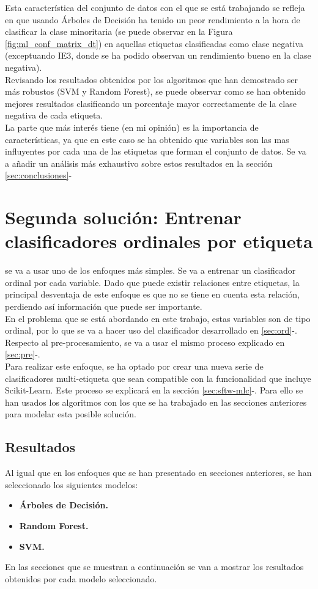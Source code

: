 Esta característica del conjunto de datos con el que se está trabajando se refleja en que usando Árboles de Decisión ha tenido un peor rendimiento a la hora de clasificar la clase minoritaria (se puede observar en la Figura \ref{fig:ml_conf_matrix_dt}) en aquellas etiquetas clasificadas como clase negativa (exceptuando IE3, donde se ha podido observan un rendimiento bueno en la clase negativa).\\
Revisando los resultados obtenidos por los algoritmos que han demostrado ser más robustos (SVM y Random Forest), se puede observar como se han obtenido mejores resultados clasificando un porcentaje mayor correctamente de la clase negativa de cada etiqueta.\\
\linebreak
La parte que más interés tiene (en mi opinión) es la importancia de características, ya que en este caso se ha obtenido que variables son las mas influyentes por cada una de las etiquetas que forman el conjunto de datos. Se va a añadir un análisis más exhaustivo sobre estos resultados en la sección \ref{sec:conclusiones}-
\clearpage
\section{Segunda solución: Entrenar clasificadores ordinales por etiqueta}
se va a usar uno de los enfoques más simples. Se va a entrenar un clasificador ordinal por cada variable.
Dado que puede existir relaciones entre etiquetas, la principal desventaja de este enfoque es que no se tiene en cuenta esta relación, perdiendo así información que puede ser importante.\\
\linebreak
En el problema que se está abordando en este trabajo, estas variables son de tipo ordinal, por lo que se va a hacer uso del clasificador desarrollado en \ref{sec:ord}-.
Respecto al pre-procesamiento, se va a usar el mismo proceso explicado en \ref{sec:pre}-.\\

Para realizar este enfoque, se ha optado por crear una nueva serie de clasificadores multi-etiqueta que sean compatible con la funcionalidad que incluye Scikit-Learn. Este proceso se explicará en la sección \ref{sec:sftw-mlc}-. Para ello se han usados los algoritmos con los que se ha trabajado en las secciones anteriores para modelar esta posible solución.
\subsection{Resultados}
Al igual que en los enfoques que se han presentado en secciones anteriores, se han seleccionado los siguientes modelos:
\begin{itemize}
	\item \textbf{Árboles de Decisión.}
	\item \textbf{Random Forest.}
	\item \textbf{SVM.}
\end{itemize}
En las secciones que se muestran a continuación se van a mostrar los resultados obtenidos por cada modelo seleccionado.
\clearpage
